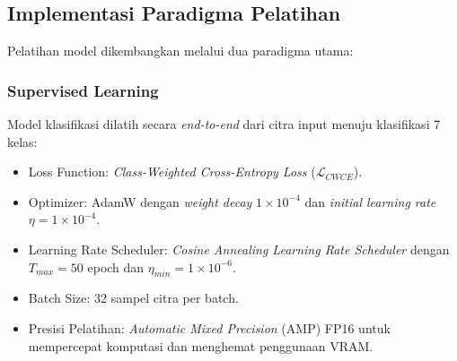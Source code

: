 \subsection{Implementasi Paradigma Pelatihan} \label{III.ParadigmaPelatihan}
Pelatihan model dikembangkan melalui dua paradigma utama:

\subsubsection{Supervised Learning}
Model klasifikasi dilatih secara \textit{end-to-end} dari citra input menuju klasifikasi 7 kelas:
\begin{itemize}[noitemsep]
	\item Loss Function: \textit{Class-Weighted Cross-Entropy Loss} ($\mathcal{L}_{CWCE}$).
	\item Optimizer: AdamW dengan \textit{weight decay} $1 \times 10^{-4}$ dan \textit{initial learning rate} $\eta = 1 \times 10^{-4}$.
	\item Learning Rate Scheduler: \textit{Cosine Annealing Learning Rate Scheduler} dengan $T_{max} = 50$ epoch dan $\eta_{min} = 1 \times 10^{-6}$.
	\item Batch Size: 32 sampel citra per batch.
	\item Presisi Pelatihan: \textit{Automatic Mixed Precision} (AMP) FP16 untuk mempercepat komputasi dan menghemat penggunaan VRAM.
\end{itemize}


